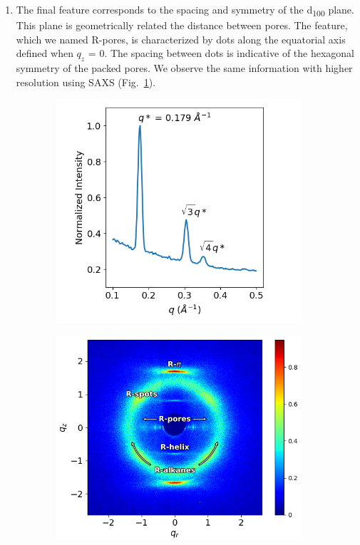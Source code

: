 \documentclass{article}
\begin{document}
\begin{enumerate}
	\item The final feature corresponds to the spacing and symmetry of the
	d\textsubscript{100} plane. This plane is geometrically related the distance
	between pores. The feature, which we named R-pores, is characterized by dots
	along the equatorial axis defined when $q_z$ = 0. The spacing between dots is
	indicative of the hexagonal symmetry of the packed pores. We observe the same
	information with higher resolution using SAXS (Fig.~\ref{fig:SAXS}). 

  \end{enumerate}

  \begin{figure}
        \centering
        \begin{subfigure}[t]{0.43\linewidth}
                \centering
                \includegraphics[width=\linewidth]{SAXS.png}
                \caption{}\label{fig:SAXS}
        \end{subfigure}
        \begin{subfigure}[t]{0.47\linewidth}
                \centering
                \includegraphics[width=\linewidth]{WAXS_annotated_words.png} 

\end{subfigure}
\end{figure}
\end{document}
